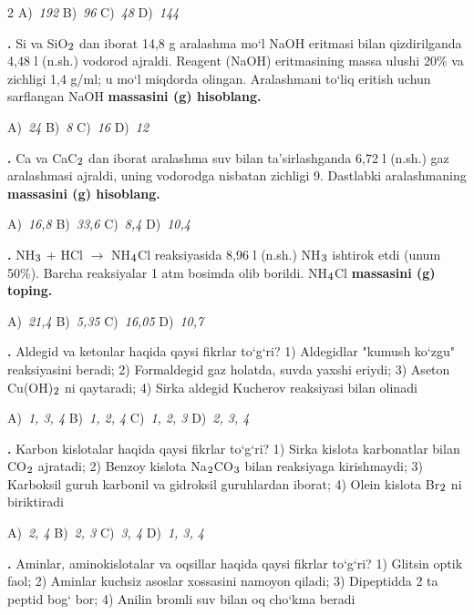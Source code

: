 \documentclass[11pt,a4paper]{article}
\renewcommand{\textsubscript}[1]{\ensuremath{_{\text{\fontsize{8}{8}\selectfont #1}}}}
\newcommand{\qn}[1]{\textbf{\fontsize{11.5}{13}\selectfont #1}}
\newcommand{\qsep}{\par\vspace{13pt}}
\begin{document}
\begin{multicols}{2}
\noindent A)~\textsl{192} \hfill B)~\textsl{96} \hfill C)~\textsl{48} \hfill D)~\textsl{144}\par
\qsep
\noindent\qn{17.} Si va SiO\textsubscript{2} dan iborat 14,8 g aralashma mo`l NaOH eritmasi bilan qizdirilganda 4,48 l (n.sh.) vodorod ajraldi. Reagent (NaOH) eritmasining massa ulushi 20\% va zichligi 1,4 g/ml; u mo`l miqdorda olingan. Aralashmani to`liq eritish uchun sarflangan NaOH \textbf{massasini (g) hisoblang.}

\noindent A)~\textsl{24} \hfill B)~\textsl{8} \hfill C)~\textsl{16} \hfill D)~\textsl{12}\par
\qsep
\noindent\qn{18.} Ca va CaC\textsubscript{2} dan iborat aralashma suv bilan ta'sirlashganda 6,72 l (n.sh.) gaz aralashmasi ajraldi, uning vodorodga nisbatan zichligi 9. Dastlabki aralashmaning \textbf{massasini (g) hisoblang.}

\noindent A)~\textsl{16,8} \hfill B)~\textsl{33,6} \hfill C)~\textsl{8,4} \hfill D)~\textsl{10,4}\par
\qsep
\noindent\qn{19.} NH\textsubscript{3} + HCl $\to$ NH\textsubscript{4}Cl reaksiyasida 8,96 l (n.sh.) NH\textsubscript{3} ishtirok etdi (unum 50\%). Barcha reaksiyalar 1 atm bosimda olib borildi. NH\textsubscript{4}Cl \textbf{massasini (g) toping.}

\noindent A)~\textsl{21,4} \hfill B)~\textsl{5,35} \hfill C)~\textsl{16,05} \hfill D)~\textsl{10,7}\par
\qsep
\noindent\qn{20.} Aldegid va ketonlar haqida qaysi fikrlar to`g`ri? 1) Aldegidlar "kumush ko`zgu" reaksiyasini beradi; 2) Formaldegid gaz holatda, suvda yaxshi eriydi; 3) Aseton Cu(OH)\textsubscript{2} ni qaytaradi; 4) Sirka aldegid Kucherov reaksiyasi bilan olinadi

\noindent A)~\textsl{1, 3, 4} \hfill B)~\textsl{1, 2, 4} \hfill C)~\textsl{1, 2, 3} \hfill D)~\textsl{2, 3, 4}\par
\qsep
\noindent\qn{21.} Karbon kislotalar haqida qaysi fikrlar to`g`ri? 1) Sirka kislota karbonatlar bilan CO\textsubscript{2} ajratadi; 2) Benzoy kislota Na\textsubscript{2}CO\textsubscript{3} bilan reaksiyaga kirishmaydi; 3) Karboksil guruh karbonil va gidroksil guruhlardan iborat; 4) Olein kislota Br\textsubscript{2} ni biriktiradi

\noindent A)~\textsl{2, 4} \hfill B)~\textsl{2, 3} \hfill C)~\textsl{3, 4} \hfill D)~\textsl{1, 3, 4}\par
\qsep
\noindent\qn{22.} Aminlar, aminokislotalar va oqsillar haqida qaysi fikrlar to`g`ri? 1) Glitsin optik faol; 2) Aminlar kuchsiz asoslar xossasini namoyon qiladi; 3) Dipeptidda 2 ta peptid bog` bor; 4) Anilin bromli suv bilan oq cho`kma beradi


\end{multicols}
\end{document}
